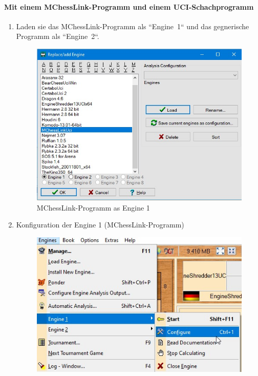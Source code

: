 \documentclass[11pt,a4paper]{article}
\begin{document}
\paragraph{Mit einem MChessLink-Programm und einem UCI-Schachprogramm}
\begin{enumerate}
\item Laden sie das  MChessLink-Programm als \mbox{``Engine 1``} und das gegnerische Programm als \mbox{``Engine 2``}.
	\begin{figure}[H]
	\centering
	\includegraphics[scale=0.7]{arena_engine1.jpg}
	\caption{MChessLink-Programm as Engine 1}
	\label{fig:ArenaEngine1}
\end{figure}
\item Konfiguration der Engine 1 (MChessLink-Programm)
\begin{figure}[H]
	\centering
	\includegraphics[scale=0.6]{arena_configureengine1.jpg}

\end{figure}
\end{enumerate}
\end{document}

